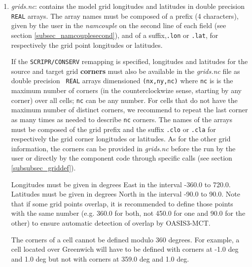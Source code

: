 \begin{enumerate}

\item {\em grids.nc}: contains the model grid longitudes and latitudes
  in double precision {\tt REAL} arrays. The array names must be
  composed of a prefix (4 characters), given by the user in the {\it
    namcouple} on the second line of each field (see section
  \ref{subsec_namcouplesecond}), and of a suffix,{\tt .lon} or {\tt .lat}, for respectively the grid point
  longitudes or latitudes.

  If the {\tt SCRIPR/CONSERV} remapping is specified, longitudes and
  latitudes for the source and target grid {\bf corners} must also be
  available in the {\em grids.nc} file as double precision {\tt
    REAL} arrays dimensioned {\tt (nx,ny,nc)}
  where {\tt nc} is is the maximum number of corners 
  (in the counterclockwize sense, starting by any corner) over all cells; 
   {\tt nc} can be any number. For cells that do not have the maximum 
  number of distinct corners, we recommend to repeat the last corner 
  as many times as needed to describe  {\tt nc} corners.
  The names of the arrays must be composed of the grid prefix
  and the suffix {\tt .clo} or {\tt .cla} for respectively the grid corner
  longitudes or latitudes.  As for the other grid information, the
  corners can be provided in {\em grids.nc} before the run by the user
  or directly by the component code through specific calls (see section
  \ref{subsubsec_griddef}).

 
  Longitudes must be given in degrees East in the interval -360.0 to
  720.0. Latitudes must be given in degrees North in the interval
  -90.0 to 90.0. Note that if some grid points overlap, it is
  recommended to define those points with the same number (e.g. 360.0
  for both, not 450.0 for one and 90.0 for the other) to ensure
  automatic detection of overlap by OASIS3-MCT.
 
  The corners of a cell cannot be defined modulo 360 degrees. For
  example, a cell located over Greenwich will have to be defined with
  corners at -1.0 deg and 1.0 deg but not with corners at 359.0 deg
  and 1.0 deg.
 

\end{enumerate}
